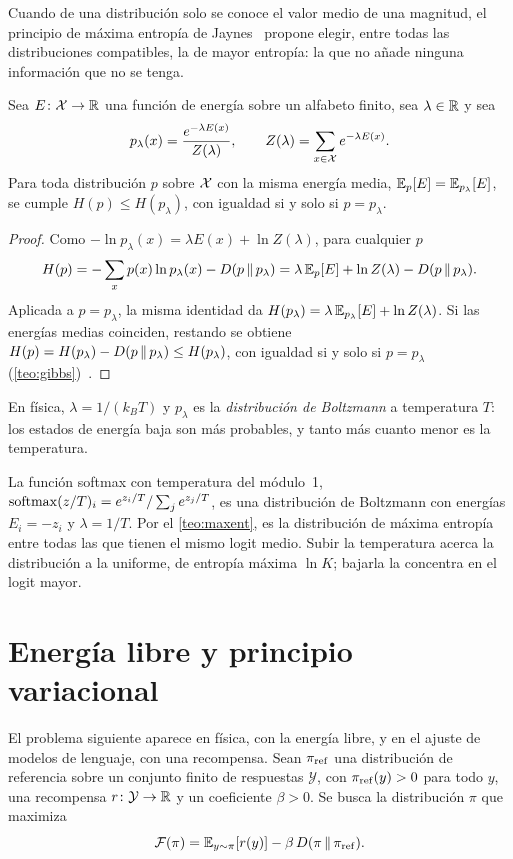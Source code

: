 Cuando de una distribución solo se conoce el valor medio de una magnitud, el principio de máxima entropía de Jaynes~\cite{jaynes} propone elegir, entre todas las distribuciones compatibles, la de mayor entropía: la que no añade ninguna información que no se tenga.

\begin{teorema}\label{teo:maxent}
Sea $E\colon\mathcal{X}\to\mathbb{R}$ una función de energía sobre un alfabeto finito, sea $\lambda\in\mathbb{R}$ y sea
\[
p_\lambda(x)=\frac{e^{-\lambda E(x)}}{Z(\lambda)},\qquad Z(\lambda)=\sum_{x\in\mathcal{X}}e^{-\lambda E(x)}.
\]
Para toda distribución $p$ sobre $\mathcal{X}$ con la misma energía media, $\mathbb{E}_p[E]=\mathbb{E}_{p_\lambda}[E]$, se cumple $H(p)\le H(p_\lambda)$, con igualdad si y solo si $p=p_\lambda$.
\end{teorema}

\begin{proof}
Como $-\ln p_\lambda(x)=\lambda E(x)+\ln Z(\lambda)$, para cualquier $p$
\[
H(p)=-\sum_xp(x)\ln p_\lambda(x)-D(p\,\|\,p_\lambda)=\lambda\,\mathbb{E}_p[E]+\ln Z(\lambda)-D(p\,\|\,p_\lambda).
\]
Aplicada a $p=p_\lambda$, la misma identidad da $H(p_\lambda)=\lambda\,\mathbb{E}_{p_\lambda}[E]+\ln Z(\lambda)$. Si las energías medias coinciden, restando se obtiene $H(p)=H(p_\lambda)-D(p\,\|\,p_\lambda)\le H(p_\lambda)$, con igualdad si y solo si $p=p_\lambda$ (\cref{teo:gibbs})~\cite[§12.1]{ct}.
\end{proof}

En física, $\lambda=1/(k_BT)$ y $p_\lambda$ es la \emph{distribución de Boltzmann} a temperatura $T$: los estados de energía baja son más probables, y tanto más cuanto menor es la temperatura.

\begin{observacion}
La función softmax con temperatura del módulo~1, $\operatorname{softmax}(z/T)_i=e^{z_i/T}/\sum_je^{z_j/T}$, es una distribución de Boltzmann con energías $E_i=-z_i$ y $\lambda=1/T$. Por el \cref{teo:maxent}, es la distribución de máxima entropía entre todas las que tienen el mismo logit medio. Subir la temperatura acerca la distribución a la uniforme, de entropía máxima $\ln K$; bajarla la concentra en el logit mayor.
\end{observacion}

\section{Energía libre y principio variacional}

El problema siguiente aparece en física, con la energía libre, y en el ajuste de modelos de lenguaje, con una recompensa. Sean $\pi_{\mathrm{ref}}$ una distribución de referencia sobre un conjunto finito de respuestas $\mathcal{Y}$, con $\pi_{\mathrm{ref}}(y)>0$ para todo $y$, una recompensa $r\colon\mathcal{Y}\to\mathbb{R}$ y un coeficiente $\beta>0$. Se busca la distribución $\pi$ que maximiza
\[
\mathcal{F}(\pi)=\mathbb{E}_{y\sim\pi}[r(y)]-\beta\,D(\pi\,\|\,\pi_{\mathrm{ref}}).
\]

